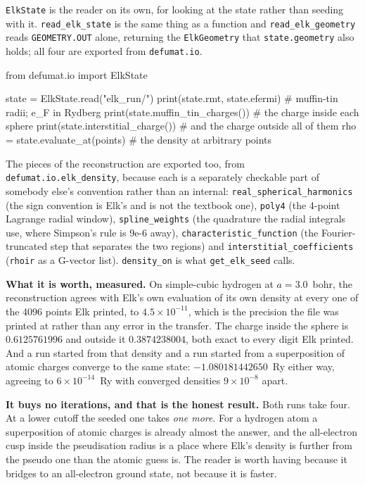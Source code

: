 \documentclass[11pt,a4paper]{article}
\newcommand{\code}[1]{\texttt{\small #1}}
\begin{document}
\code{ElkState} is the reader on its own, for looking at the state rather than
seeding with it. \code{read\_elk\_state} is the same thing as a function and
\code{read\_elk\_geometry} reads \code{GEOMETRY.OUT} alone, returning the
\code{ElkGeometry} that \code{state.geometry} also holds; all four are exported
from \code{defumat.io}.

\begin{pycode}
from defumat.io import ElkState

state = ElkState.read("elk_run/")
print(state.rmt, state.efermi)            # muffin-tin radii; e_F in Rydberg
print(state.muffin_tin_charges())         # the charge inside each sphere
print(state.interstitial_charge())        # and the charge outside all of them
rho = state.evaluate_at(points)           # the density at arbitrary points
\end{pycode}

The pieces of the reconstruction are exported too, from
\code{defumat.io.elk\_density}, because each is a separately checkable part of
somebody else's convention rather than an internal:
\code{real\_spherical\_harmonics} (the sign convention is Elk's and is not the
textbook one), \code{poly4} (the 4-point Lagrange radial window),
\code{spline\_weights} (the quadrature the radial integrals use, where Simpson's
rule is 9e-6 away), \code{characteristic\_function} (the Fourier-truncated step
that separates the two regions) and \code{interstitial\_coefficients}
(\code{rhoir} as a G-vector list). \code{density\_on} is what
\code{get\_elk\_seed} calls.

\textbf{What it is worth, measured.} On simple-cubic hydrogen at $a = 3.0$~bohr,
the reconstruction agrees with Elk's own evaluation of its own density at every
one of the 4096 points Elk printed, to $4.5\times10^{-11}$, which is the
precision the file was printed at rather than any error in the transfer. The
charge inside the sphere is $0.6125761996$ and outside it $0.3874238004$, both
exact to every digit Elk printed. And a run started from that density and a run
started from a superposition of atomic charges converge to the same state:
$-1.080181442650$~Ry either way, agreeing to $6\times10^{-14}$~Ry with converged
densities $9\times10^{-8}$ apart.

\textbf{It buys no iterations, and that is the honest result.} Both runs take
four. At a lower cutoff the seeded one takes \emph{one more}. For a hydrogen
atom a superposition of atomic charges is already almost the answer, and the
all-electron cusp inside the pseudisation radius is a place where Elk's density
is further from the pseudo one than the atomic guess is. The reader is worth
having because it bridges to an all-electron ground state, not because it is
faster.
\end{document}
